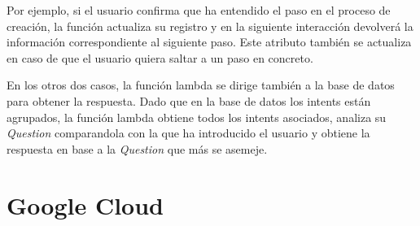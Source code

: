\begin{enumerate}[7.]
    Por ejemplo, si el usuario confirma que ha entendido el paso en el proceso de creación, la función actualiza su registro y en la siguiente interacción devolverá la información correspondiente al siguiente paso. Este atributo también se actualiza en caso de que el usuario quiera saltar a un paso en concreto. 

    En los otros dos casos, la función lambda se dirige también a la base de datos para obtener la respuesta. Dado que en la base de datos los intents están agrupados, la función lambda obtiene todos los intents asociados, analiza su \textit{Question} comparandola con la que ha introducido el usuario y obtiene la respuesta en base a la \textit{Question} que más se asemeje. 

    
    
\end{enumerate}



\section{Google Cloud}\label{GCP}
